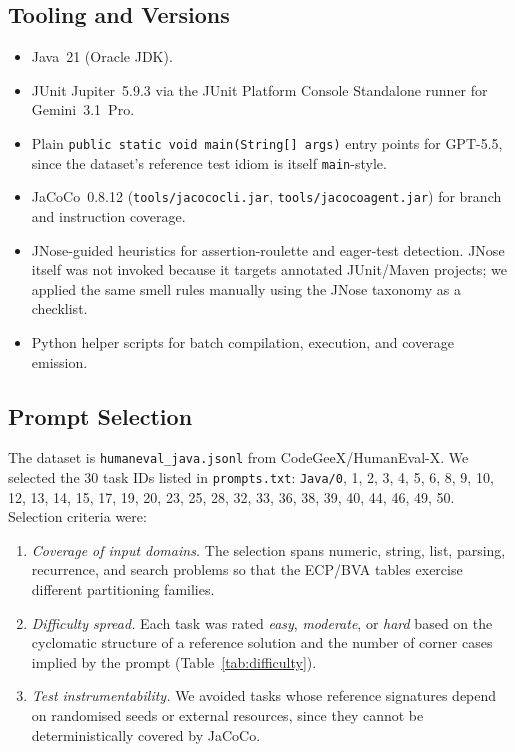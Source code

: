 \documentclass[journal]{IEEEtran}
\begin{document}
\subsection{Tooling and Versions}
\begin{itemize}
    \item Java~21 (Oracle JDK).
    \item JUnit Jupiter~5.9.3 via the JUnit Platform Console
    Standalone runner for Gemini~3.1~Pro.
    \item Plain \texttt{public static void main(String[]~args)}
    entry points for GPT-5.5, since the dataset's reference test
    idiom is itself \texttt{main}-style.
    \item JaCoCo~0.8.12 (\texttt{tools/jacococli.jar},
    \texttt{tools/jacocoagent.jar}) for branch and instruction
    coverage.
    \item JNose-guided heuristics for assertion-roulette and
    eager-test detection. JNose itself was not invoked because
    it targets annotated JUnit/Maven projects; we applied the
    same smell rules manually using the JNose taxonomy as a
    checklist.
    \item Python helper scripts for batch compilation,
    execution, and coverage emission.
\end{itemize}

\subsection{Prompt Selection}
The dataset is \texttt{humaneval\_java.jsonl} from
CodeGeeX/HumanEval-X. We selected the 30 task IDs listed in
\texttt{prompts.txt}: \texttt{Java/0}, 1, 2, 3, 4, 5, 6, 8, 9,
10, 12, 13, 14, 15, 17, 19, 20, 23, 25, 28, 32, 33, 36, 38,
39, 40, 44, 46, 49, 50. Selection criteria were:
\begin{enumerate}
    \item \emph{Coverage of input domains.} The selection
    spans numeric, string, list, parsing, recurrence, and
    search problems so that the ECP/BVA tables exercise
    different partitioning families.
    \item \emph{Difficulty spread.} Each task was rated
    \emph{easy}, \emph{moderate}, or \emph{hard} based on the
    cyclomatic structure of a reference solution and the
    number of corner cases implied by the prompt
    (Table~\ref{tab:difficulty}).
    \item \emph{Test instrumentability.} We avoided tasks
    whose reference signatures depend on randomised seeds or
    external resources, since they cannot be deterministically
    covered by JaCoCo.
\end{enumerate}
\end{document}
